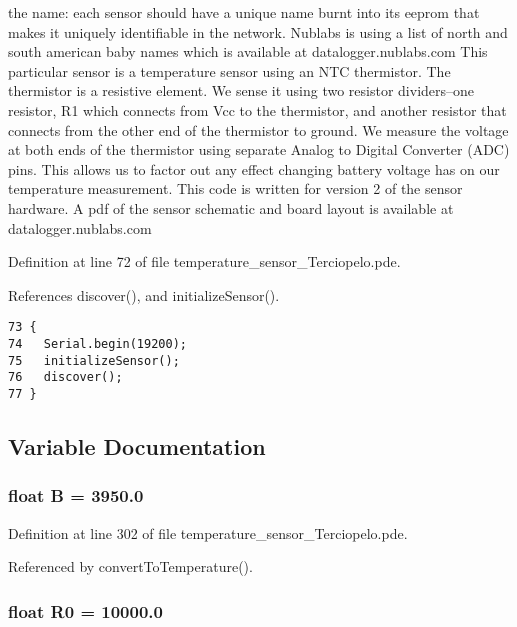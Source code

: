 the name: each sensor should have a unique name burnt into its eeprom that makes it uniquely identifiable in the network. Nublabs is using a list of north and south american baby names which is available at datalogger.nublabs.com This particular sensor is a temperature sensor using an NTC thermistor. The thermistor is a resistive element. We sense it using two resistor dividers--one resistor, R1 which connects from Vcc to the thermistor, and another resistor that connects from the other end of the thermistor to ground. We measure the voltage at both ends of the thermistor using separate Analog to Digital Converter (ADC) pins. This allows us to factor out any effect changing battery voltage has on our temperature measurement. This code is written for version 2 of the sensor hardware. A pdf of the sensor schematic and board layout is available at datalogger.nublabs.com 

Definition at line 72 of file temperature\_\-sensor\_\-Terciopelo.pde.

References discover(), and initializeSensor().

\begin{Code}\begin{verbatim}73 {
74   Serial.begin(19200);
75   initializeSensor();
76   discover();
77 }
\end{verbatim}
\end{Code}




\subsection{Variable Documentation}
\hypertarget{temperature__sensor___terciopelo_8pde_8188fea1f6709096fe21a3ee084d00d0}{
\subsubsection[{B}]{\setlength{\rightskip}{0pt plus 5cm}float {\bf B} = 3950.0}}
\label{temperature__sensor___terciopelo_8pde_8188fea1f6709096fe21a3ee084d00d0}




Definition at line 302 of file temperature\_\-sensor\_\-Terciopelo.pde.

Referenced by convertToTemperature().\hypertarget{temperature__sensor___terciopelo_8pde_735577560ca40e5b6008a98829068904}{
\subsubsection[{R0}]{\setlength{\rightskip}{0pt plus 5cm}float {\bf R0} = 10000.0}}
\label{temperature__sensor___terciopelo_8pde_735577560ca40e5b6008a98829068904}




